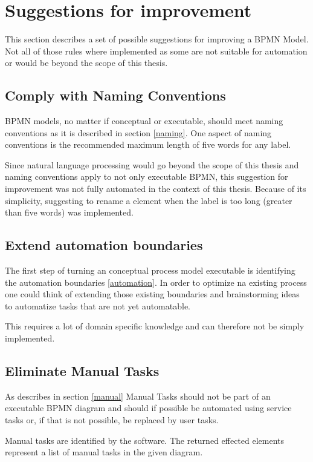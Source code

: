 \section{Suggestions for improvement}\label{last}
This section describes a set of possible suggestions for improving a BPMN Model. Not all of those rules where implemented as some are not suitable for automation or would be beyond the scope of this thesis. 

\subsection{Comply with Naming Conventions}
BPMN models, no matter if conceptual or executable, should meet naming conventions as it is described in section \ref{naming}. One aspect of naming conventions is the recommended maximum length of five words for any label. 

Since natural language processing would go beyond the scope of this thesis and naming conventions apply to not only executable BPMN, this suggestion for improvement was not fully automated in the context of this thesis. Because of its simplicity, suggesting to rename a element when the label is too long (greater than five words) was implemented.

\subsection{Extend automation boundaries}
The first step of turning an conceptual process model executable is identifying the automation boundaries \ref{automation}. In order to optimize na existing process one could think of extending those existing boundaries and brainstorming ideas to automatize tasks that are not yet automatable. 

This requires a lot of domain specific knowledge and can therefore not be simply implemented.

\subsection{Eliminate Manual Tasks}
As describes in section \ref{manual} Manual Tasks should not be part of an executable BPMN diagram and should if possible be automated using service tasks or, if that is not possible, be replaced by user tasks. 

Manual tasks are identified by the software. The returned effected elements represent a list of manual tasks in the given diagram.

